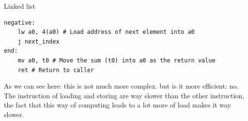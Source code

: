 \begin{parag}{Linked list}
\begin{lstlisting}[language={[RISC-V]Assembler}]
negative:
	lw a0, 4(a0) # Load address of next element into a0
	j next_index
end: 
	mv a0, t0 # Move the sum (t0) into a0 as the return value
	ret # Return to caller
	\end{lstlisting}
	
	As we can see here: this is not much more complex. but is it more efficient: no. The instruction of loading and storing are way slower than the other instruction, the fact that this way of computing leads to a lot more of load makes it way slower.
	
	
\end{parag}






